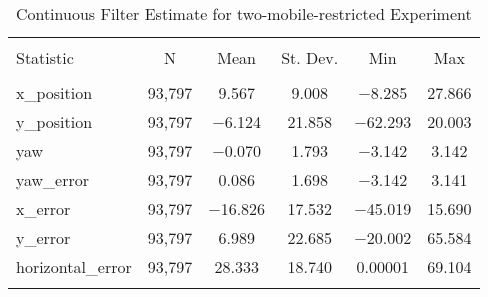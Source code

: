 
\begin{table}[h] \centering 
  \caption{Continuous Filter Estimate for two-mobile-restricted Experiment} 
  \label{tab:two_mobile_restricted_continuous_summary} 
\begin{tabular}{@{\extracolsep{5pt}}lccccc} 
\\[-1.8ex]\hline 
\hline \\[-1.8ex] 
Statistic & \multicolumn{1}{c}{N} & \multicolumn{1}{c}{Mean} & \multicolumn{1}{c}{St. Dev.} & \multicolumn{1}{c}{Min} & \multicolumn{1}{c}{Max} \\ 
\hline \\[-1.8ex] 
x\_position & 93,797 & 9.567 & 9.008 & $-$8.285 & 27.866 \\ 
y\_position & 93,797 & $-$6.124 & 21.858 & $-$62.293 & 20.003 \\ 
yaw & 93,797 & $-$0.070 & 1.793 & $-$3.142 & 3.142 \\ 
yaw\_error & 93,797 & 0.086 & 1.698 & $-$3.142 & 3.141 \\ 
x\_error & 93,797 & $-$16.826 & 17.532 & $-$45.019 & 15.690 \\ 
y\_error & 93,797 & 6.989 & 22.685 & $-$20.002 & 65.584 \\ 
horizontal\_error & 93,797 & 28.333 & 18.740 & 0.00001 & 69.104 \\ 
\hline \\[-1.8ex] 
\end{tabular} 
\end{table} 
